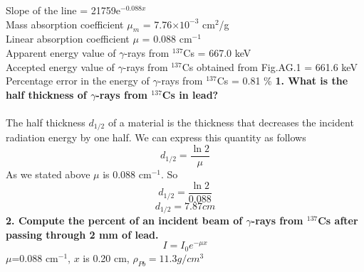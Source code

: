\documentclass[a4paper,12pt]{article}
\begin{document}
Slope of the line = 21759e$^{-0.088x}$\\
Mass absorption coefficient $\mu_{m}$ = 7.76$\times 10^{-3}$ cm$^{2}$/g\\
Linear absorption coefficient $\mu$ = 0.088 cm$^{-1}$\\
Apparent energy value of $\gamma$-rays from $^{137}$Cs = 667.0 keV\\
Accepted energy value of $\gamma$-rays from $^{137}$Cs obtained from Fig.AG.1 = 661.6 keV \\
Percentage error in the energy of $\gamma$-rays from $^{137}$Cs = 0.81 \%
\newpage
\textbf{1. What is the half thickness of $\gamma$-rays from $^{137}$Cs in lead?}\\\\
The half thickness $d_{1/2}$ of a material is the thickness that decreases the incident radiation energy by one half. We can express this quantity as follows 
\begin{equation}
d_{1/2}=\frac{\ln 2}{\mu }
\end{equation}
As we stated above $\mu$ is 0.088 cm$^{-1}$. So
\begin{equation}
d_{1/2}=\frac{\ln 2}{0.088}
\end{equation}
\begin{equation}
d_{1/2}=7.87 cm
\end{equation}
\textbf{2. Compute the percent of an incident beam of $\gamma$-rays from $^{137}$Cs after passing through 2 mm of lead.}
\begin{equation}
I=I_{0}e^{-\mu x}
\end{equation}
$\mu$=0.088 cm$^{-1}$, $x$ is 0.20 cm, $\rho_{Pb}=11.3 g/cm^{3}$
\end{document}
